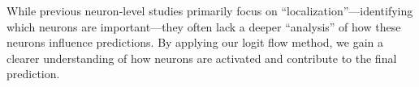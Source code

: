 While previous neuron-level studies primarily focus on ``localization''—identifying which neurons are important—they often lack a deeper ``analysis'' of how these neurons influence predictions. By applying our logit flow method, we gain a clearer understanding of how neurons are activated and contribute to the final prediction.